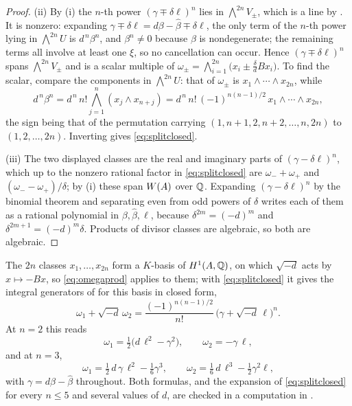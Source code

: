 \begin{proof}
(ii) By (i) the $n$-th power $(\gamma\mp\delta\ell)^{n}$ lies in
$\bigwedge^{2n}V_{\pm}$, which is a line by . It is
nonzero: expanding $\gamma\mp\delta\ell=d\beta-\widehat{\beta}\mp\delta\ell$,
the only term of the $n$-th power lying in $\bigwedge^{2n}U$ is
$d^{\,n}\beta^{n}$, and $\beta^{n}\ne0$ because $\beta$ is nondegenerate;
the remaining terms all involve at least one $\xi$, so no cancellation can
occur. Hence $(\gamma\mp\delta\ell)^{n}$ spans $\bigwedge^{2n}V_{\pm}$ and is a
scalar multiple of $\omega_{\pm}=\bigwedge_{i=1}^{2n}\bigl(x_{i}\pm\tfrac{\delta}{d}Bx_{i}\bigr)$.
To find the scalar, compare the components in $\bigwedge^{2n}U$: that of
$\omega_{\pm}$ is $x_{1}\wedge\cdots\wedge x_{2n}$, while
\[
  d^{\,n}\beta^{n}=d^{\,n}\,n!\bigwedge_{j=1}^{n}(x_{j}\wedge x_{n+j})
  =d^{\,n}\,n!\,(-1)^{n(n-1)/2}\,x_{1}\wedge\cdots\wedge x_{2n},
\]
the sign being that of the permutation carrying
$(1,n+1,2,n+2,\dots,n,2n)$ to $(1,2,\dots,2n)$. Inverting gives
\eqref{eq:splitclosed}.

(iii) The two displayed classes are the real and imaginary parts of
$(\gamma-\delta\ell)^{n}$, which up to the nonzero rational factor in
\eqref{eq:splitclosed} are $\omega_{-}+\omega_{+}$ and
$(\omega_{-}-\omega_{+})/\delta$; by (i) these span
$W(A)$ over $\mathbb{Q}$. Expanding $(\gamma-\delta\ell)^{n}$ by the binomial
theorem and separating even from odd powers of $\delta$ writes each of them as
a rational polynomial in $\beta,\widehat{\beta},\ell$, because
$\delta^{2m}=(-d)^{m}$ and $\delta^{2m+1}=(-d)^{m}\delta$. Products of divisor
classes are algebraic, so both are algebraic.
\end{proof}

\begin{example}\label{ex:splitsmall}
The $2n$ classes $x_{1},\dots,x_{2n}$ form a $K$-basis of $H^{1}(A,\mathbb{Q})$, on
which $\sqrt{-d}$ acts by $x\mapsto-Bx$, so \eqref{eq:omegaprod} applies to
them; with \eqref{eq:splitclosed} it gives the integral generators of
 for this basis in closed form,
\[
  \omega_{1}+\sqrt{-d}\,\omega_{2}
  =\frac{(-1)^{n(n-1)/2}}{n!}\,\bigl(\gamma+\sqrt{-d}\,\ell\bigr)^{n}.
\]
At $n=2$ this reads
\[
  \omega_{1}=\tfrac12\bigl(d\,\ell^{2}-\gamma^{2}\bigr),
  \qquad
  \omega_{2}=-\gamma\,\ell,
\]
and at $n=3$,
\[
  \omega_{1}=\tfrac12\,d\,\gamma\,\ell^{2}-\tfrac16\gamma^{3},
  \qquad
  \omega_{2}=\tfrac16\,d\,\ell^{3}-\tfrac12\gamma^{2}\ell,
\]
with $\gamma=d\beta-\widehat{\beta}$ throughout. Both formulas, and the
expansion of \eqref{eq:splitclosed} for every $n\le5$ and several values of
$d$, are checked in a computation in \cite{BMB26}.
\end{example}

